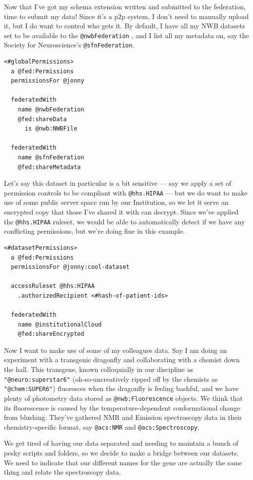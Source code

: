 \documentclass[10pt]{article}
\begin{document}
\begin{multicols}{2}
Now that I've got my schema extension written and submitted to the
federation, time to submit my data! Since it's a p2p system, I don't
need to manually upload it, but I do want to control who gets it. By
default, I have all my NWB datasets set to be available to the
\texttt{@nwbFederation} , and I list all my metadata on, say the Society
for Neuroscience's \texttt{@sfnFederation}.

\begin{verbatim}
<#globalPermissions>
  a @fed:Permissions
  permissionsFor @jonny

  federatedWith 
    name @nwbFederation
    @fed:shareData 
      is @nwb:NWBFile

  federatedWith
    name @sfnFederation
    @fed:shareMetadata
\end{verbatim}

Let's say this dataset in particular is a bit sensitive --- say we apply
a set of permission controls to be compliant with \texttt{@hhs.HIPAA}
--- but we do want to make use of some public server space run by our
Institution, so we let it serve an encrypted copy that those I've shared
it with can decrypt. Since we've applied the \texttt{@hhs.HIPAA}
ruleset, we would be able to automatically detect if we have any
conflicting permissions, but we're doing fine in this example.

\begin{verbatim}
<#datasetPermissions>
  a @fed:Permissions
  permissionsFor @jonny:cool-dataset

  accessRuleset @hhs:HIPAA
    .authorizedRecipient <#hash-of-patient-ids>
  
  federatedWith
    name @institutionalCloud
    @fed:shareEncrypted
\end{verbatim}

Now I want to make use of some of my colleagues data. Say I am doing an
experiment with a transgenic dragonfly and collaborating with a chemist
down the hall. This transgene, known colloquially in our discipline as
\texttt{"@neuro:superstar6"} (oh-so-uncreatively ripped off by the
chemists as \texttt{"@chem:SUPER6"}) fluoresces when the dragonfly is
feeling bashful, and we have plenty of photometry data stored as
\texttt{@nwb:Fluorescence} objects. We think that its fluorescence is
caused by the temperature-dependent conformational change from blushing.
They've gathered NMR and Emission spectroscopy data in their
chemistry-specific format, say \texttt{@acs:NMR} and
\texttt{@acs:Spectroscopy}.

We get tired of having our data separated and needing to maintain a
bunch of pesky scripts and folders, so we decide to make a bridge
between our datasets. We need to indicate that our different names for
the gene are actually the same thing and relate the spectroscopy data.


\end{multicols}
\end{document}
